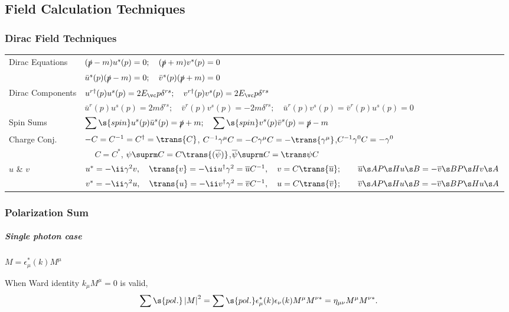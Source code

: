 \newpage
\subsection{Field Calculation Techniques}
\subsubsection{Dirac Field Techniques}
\begin{tabular}{l@{ :\ \ \ }l}
Dirac Equations & $(\slashed p-m)u^s(p)=0;\quad(\slashed p+m)v^s(p)=0$\\
&$\bar u^s(p)(\slashed p-m)=0;\quad \bar v^s(p)(\slashed p+m)=0$\\
Dirac Components &
   $u^{r\dagger}(p) u^s(p)=2E_\vc p\delta^{rs};\quad
    v^{r\dagger}(p) v^s(p)=2E_\vc p\delta^{rs}$\\
 & $\bar u^r(p)u^s(p)=2m\delta^{rs};\quad
    \bar v^r(p)v^s(p)=-2m\delta^{rs};\quad
    \bar u^r(p)v^s(p)=\bar v^r(p)u^s(p)=0$\\
Spin Sums & $\displaystyle
             \sum\s{spin}u^s(p)\bar u^s(p)=\slashed p+m;\quad
             \sum\s{spin}v^s(p)\bar v^s(p)=\slashed p-m$\\
Charge Conj.   & $-C=C^{-1}=C^\dagger=\trans{C}$,   \quad $C^{-1}\Gm C=-C\Gm C=-\trans{\Gm}$,\quad $C^{-1}\G0C=-\G0$\\
               & $\phantom{-}C=C^*$\hspace{57.6pt}, \quad $\psi\suprm C=C\trans{(\overline\psi)}$,\quad$\overline\psi{}\suprm C=\trans\psi C$\\
 $u$ \& $v$    & $u^*=-\ii\G2v,\quad \trans{v}=-\ii u^\dagger\G2 = \overline u C^{-1}, \quad v=C\trans{\overline u};  \qquad \overline u\s A {P\s H} u\s B = -\overline v\s B{P\s H}v\s A$\\
               & $v^*=-\ii\G2u,\quad \trans{u}=-\ii v^\dagger\G2 = \overline v C^{-1}, \quad u=C\trans{\overline v}; \qquad \overline v\s A {P\s H} u\s B = -\overline v\s B{P\s H}u\s A$\\
\end{tabular}

\subsubsection{Polarization Sum}

\subparagraph{Single photon case}$M=\epsilon_\mu^*(k)M^{\mu}$\par
When Ward identity $k_\mu M^\mu=0$ is valid,
\begin{equation}
   \sum\s{pol.}\left|M\right|^2
= \sum\s{pol.}\epsilon_\mu^*(k)\epsilon_\nu(k)M^{\mu}M^{\nu*}
=             \Hmnd M^{\mu}M^{\nu*}.
\end{equation}

